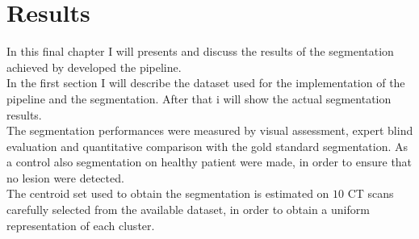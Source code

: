 \documentclass{standalone}
\begin{document}
	\chapter{Results}
	
	In this final chapter I will presents and discuss the results of the segmentation achieved by developed the pipeline.\\
	In the first section I will describe the dataset used for the implementation of the pipeline and the segmentation. After that i will show the actual segmentation results.\\
	The segmentation performances were measured by visual assessment, expert blind evaluation  and quantitative comparison with the gold standard segmentation. As a control also segmentation on healthy patient were made, in order to ensure that no lesion were detected.\\
	The centroid set used to obtain the segmentation is estimated on $10$ CT scans carefully selected from the available dataset, in order to obtain a uniform representation of each cluster.
\end{document}
